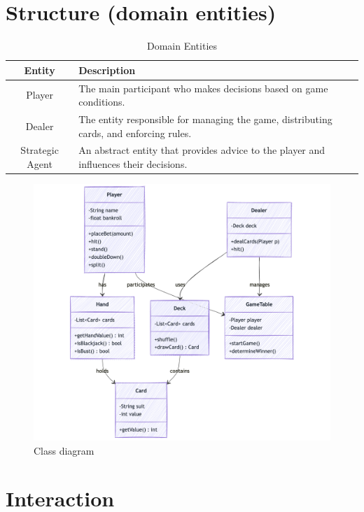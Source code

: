 \section{Structure (domain entities)}

\begin{table}[h]
    \centering
    \renewcommand{\arraystretch}{1.3}
    \begin{tabular}{|c|p{8cm}|}
        \hline
        \textbf{Entity} & \textbf{Description} \\
        \hline
        Player & The main participant who makes decisions based on game conditions. \\
        \hline
        Dealer & The entity responsible for managing the game, distributing cards, and enforcing rules. \\
        \hline
        Strategic Agent & An abstract entity that provides advice to the player and influences their decisions. \\
        \hline
    \end{tabular}
    \caption{Domain Entities}
    \label{tab:domain_entities}
\end{table}

\begin{figure}[!htb]
    \centering
    \includegraphics[scale=0.55]{report/img/classDiagram.png}
    \caption{Class diagram}
    \label{fig:classDiagram}
\end{figure}

\section{Interaction}

